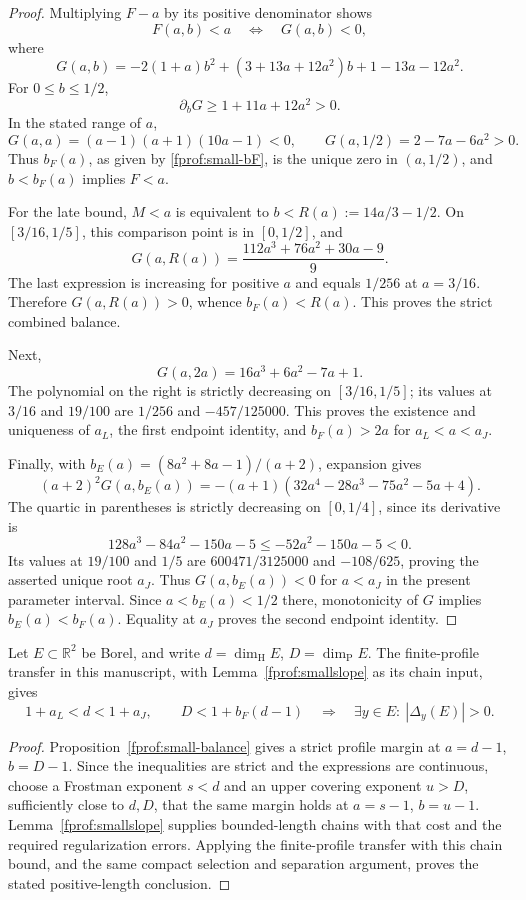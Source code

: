 \begin{proof}
Multiplying \(F-a\) by its positive denominator shows
$$
 F(a,b)<a\quad\Longleftrightarrow\quad G(a,b)<0,
$$
where
$$
 G(a,b)=-2(1+a)b^2+(3+13a+12a^2)b+1-13a-12a^2.
$$
For \(0\le b\le1/2\),
$$
 \partial_bG\ge1+11a+12a^2>0.
$$
In the stated range of \(a\),
$$
 G(a,a)=(a-1)(a+1)(10a-1)<0,\qquad
 G(a,1/2)=2-7a-6a^2>0.
$$
Thus \(b_F(a)\), as given by \eqref{fprof:small-bF}, is the unique zero
in \((a,1/2)\), and \(b<b_F(a)\) implies \(F<a\).

For the late bound, \(M<a\) is equivalent to
\(b<R(a):=14a/3-1/2\). On \([3/16,1/5]\), this comparison point is
in \([0,1/2]\), and
$$
 G(a,R(a))=\frac{112a^3+76a^2+30a-9}{9}.
$$
The last expression is increasing for positive \(a\) and equals
\(1/256\) at \(a=3/16\). Therefore \(G(a,R(a))>0\), whence
\(b_F(a)<R(a)\). This proves the strict combined balance.

Next,
$$
 G(a,2a)=16a^3+6a^2-7a+1.
$$
The polynomial on the right is strictly decreasing on
\([3/16,1/5]\); its values at \(3/16\) and \(19/100\) are
\(1/256\) and \(-457/125000\). This proves the existence and uniqueness
of \(a_L\), the first endpoint identity, and \(b_F(a)>2a\) for
\(a_L<a<a_J\).

Finally, with \(b_E(a)=(8a^2+8a-1)/(a+2)\), expansion gives
$$
 (a+2)^2G(a,b_E(a))
 =-(a+1)(32a^4-28a^3-75a^2-5a+4).
$$
The quartic in parentheses is strictly decreasing on \([0,1/4]\), since
its derivative is
$$
 128a^3-84a^2-150a-5
 \le-52a^2-150a-5<0.
$$
Its values at \(19/100\) and \(1/5\) are
\(600471/3125000\) and \(-108/625\), proving the asserted unique
root \(a_J\). Thus \(G(a,b_E(a))<0\) for \(a<a_J\) in the present
parameter interval. Since \(a<b_E(a)<1/2\) there, monotonicity of
\(G\) implies \(b_E(a)<b_F(a)\). Equality at \(a_J\) proves the
second endpoint identity.
\end{proof}

\begin{proposition}
\label{fprof:small-packing}
Let \(E\subset\mathbb R^2\) be Borel, and write
\(d=\dim_{\mathrm H}E\), \(D=\dim_{\mathrm P}E\). The finite-profile
transfer in this manuscript, with Lemma~\ref{fprof:smallslope} as its
chain input, gives
$$
 1+a_L<d<1+a_J,\qquad D<1+b_F(d-1)
 \quad\Longrightarrow\quad
 \exists y\in E:\ |\Delta_y(E)|>0.
$$
\end{proposition}

\begin{proof}
Proposition~\ref{fprof:small-balance} gives a strict profile margin at
\(a=d-1\), \(b=D-1\). Since the inequalities are strict and the
expressions are continuous, choose a Frostman exponent \(s<d\) and an
upper covering exponent \(u>D\), sufficiently close to \(d,D\), that
the same margin holds at \(a=s-1\), \(b=u-1\).
Lemma~\ref{fprof:smallslope} supplies bounded-length chains with that
cost and the required regularization errors. Applying the finite-profile
transfer with this chain bound, and the same compact selection and
separation argument, proves the stated positive-length conclusion.
\end{proof}

